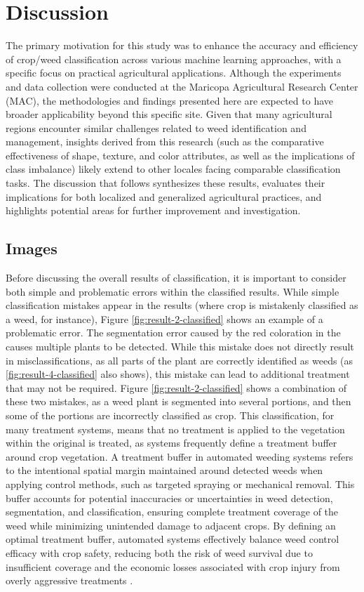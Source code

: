 \documentclass[letterpaper]{report}
\begin{document}
\chapter{Discussion}
\label{section:discussion}
The primary motivation for this study was to enhance the accuracy and efficiency of crop/weed classification across various machine learning approaches, with a specific focus on practical agricultural applications. Although the experiments and data collection were conducted at the Maricopa Agricultural Research Center (MAC), the methodologies and findings presented here are expected to have broader applicability beyond this specific site. Given that many agricultural regions encounter similar challenges related to weed identification and management, insights derived from this research (such as the comparative effectiveness of shape, texture, and color attributes, as well as the implications of class imbalance) likely extend to other locales facing comparable classification tasks. The discussion that follows synthesizes these results, evaluates their implications for both localized and generalized agricultural practices, and highlights potential areas for further improvement and investigation.

\section{Images}
Before discussing the overall results of classification, it is important to consider both simple and problematic errors within the classified results. While simple classification mistakes appear in the results (where crop is mistakenly classified as a weed, for instance), Figure \ref{fig:result-2-classified} shows an example of a problematic error. The segmentation error caused by the red coloration in the causes multiple plants to be detected. While this mistake does not directly result in misclassifications, as all parts of the plant are correctly identified as weeds (as \ref{fig:result-4-classified} also shows), this mistake can lead to additional treatment that may not be required. Figure \ref{fig:result-2-classified} shows a combination of these two mistakes, as a weed plant is segmented into several portions, and then some of the portions are incorrectly classified as crop. This classification, for many treatment systems, means that no treatment is applied to the vegetation within the original is treated, as systems frequently define a treatment buffer around crop vegetation. A treatment buffer in automated weeding systems refers to the intentional spatial margin maintained around detected weeds when applying control methods, such as targeted spraying or mechanical removal. This buffer accounts for potential inaccuracies or uncertainties in weed detection, segmentation, and classification, ensuring complete treatment coverage of the weed while minimizing unintended damage to adjacent crops. By defining an optimal treatment buffer, automated systems effectively balance weed control efficacy with crop safety, reducing both the risk of weed survival due to insufficient coverage and the economic losses associated with crop injury from overly aggressive treatments \parencite{Scott-Stoddard2023-he, Sapkota2023-kx}.
\end{document}
